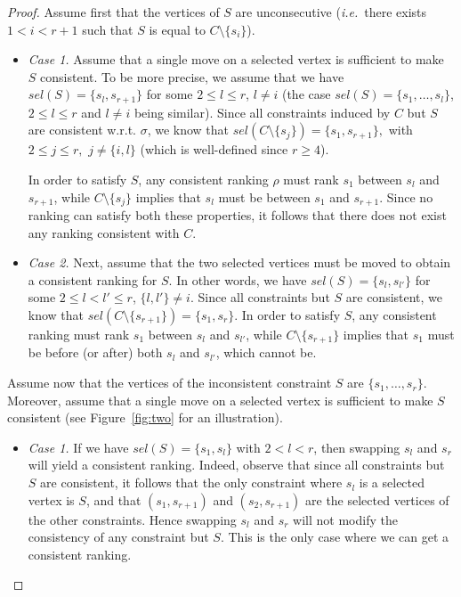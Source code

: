 \documentclass[11pt]{article}
\def\ie{{\em i.e.}~}
\begin{document}
\begin{proof}
	Assume first that the vertices of $S$ are unconsecutive (\ie there exists $1 < i < r+1$ such that $S$ is equal to $C \setminus \{s_i\}$). 
	
	\begin{itemize}
	
		\item \emph{Case 1.} Assume that a single move on a selected vertex is sufficient to make $S$ consistent. To be more precise, we assume that we have $sel(S) = \{s_l, s_{r+1}\}$ for some $2 \leqslant l \leqslant r$, $l \neq i$ (the case $sel(S) = \{s_1, \ldots, s_l\}$, 
		$2 \leqslant l \leqslant r$ and $l \neq i$ being similar). Since all constraints induced by $C$ but $S$ are consistent w.r.t. $\sigma$, we know that $sel(C \setminus \{s_j\}) = \{s_1, s_{r+1}\},$ with $2 \leqslant j \leqslant r,$ $ j \neq \{i,l\}$ (which is well-defined since $r \geqslant 4$).

In order to satisfy $S$, any consistent ranking $\rho$ must rank $s_1$ between $s_l$ and $s_{r+1}$, while $C \setminus \{s_j\}$ implies that $s_l$ must be between $s_1$ and $s_{r+1}$. Since no ranking can satisfy both these properties, it follows that there does not exist any ranking consistent with $C$.

	\item \emph{Case 2.} Next, assume that the two selected vertices must be moved to obtain a consistent ranking for $S$. In other words, we have $sel(S) = \{s_l, s_{l'}\}$ for some $2 \leqslant l < l' \leqslant r$, $\{l,l'\} \neq i$. Since all constraints but $S$ are consistent, we know that $sel(C \setminus \{s_{r+1}\}) = \{s_1, s_r\}$. In 
	order to satisfy $S$, any 
	consistent ranking must rank $s_1$ between $s_l$ and $s_{l'}$, while 
	$C \setminus \{s_{r+1}\}$ implies that $s_1$ must be before (or after) both 
	$s_l$ and $s_{l'}$, which cannot be. 

\end{itemize}

	Assume now that the vertices of the inconsistent constraint $S$ are $\{s_1, \ldots, s_r\}$. Moreover, assume that a single move on a selected vertex is sufficient to make $S$ consistent (see Figure~\ref{fig:two} for an illustration). 
	
	\begin{itemize}
	
	\item \emph{Case 1.} If we have $sel(S) = \{s_1, s_l\}$ with $2 < l < r$, then swapping $s_l$ and $s_r$ will yield a consistent ranking. Indeed, observe that since all constraints but $S$ are consistent, it follows that the only constraint where $s_l$ is a selected vertex is $S$, and that $(s_1, s_{r+1})$ and $(s_2, s_{r+1})$ are the selected vertices of the other constraints. Hence swapping $s_l$ and $s_r$ will not modify the consistency of any constraint but $S$. This is the only case where we can get a consistent ranking. 
	

\end{itemize}
\end{proof}
\end{document}
